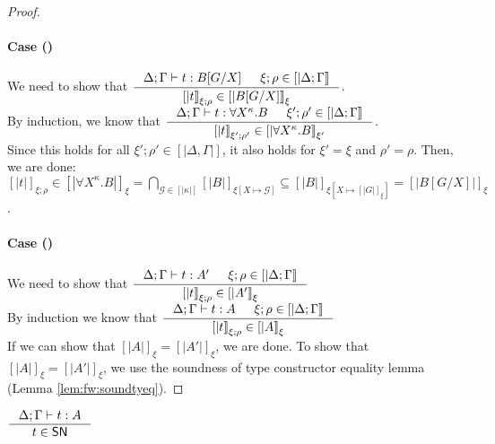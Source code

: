 \begin{proof}
\paragraph{Case ()}
We need to show that
$ \inference{\Delta;\Gamma |- t : B[G/X] & \xi;\rho\in[|\Delta;\Gamma|]}
        {[|t|]_{\xi;\rho} \in [|B[G/X]|]_\xi} $.
\vspace*{.3em} \\
By induction, we know that
$ \inference
        { \Delta;\Gamma |- t : \forall X^\kappa.B
        & \xi';\rho'\in[|\Delta;\Gamma|] }
        {[|t|]_{\xi';\rho'} \in [|\forall X^\kappa.B|]_{\xi'}} $.
\vspace*{.3em} \\
Since this holds for all $\xi';\rho' \in [|\Delta,\Gamma|]$,
it also holds for $\xi'=\xi$ and $\rho'=\rho$. Then, we are done:
$ [|t|]_{\xi;\rho} \in [|\forall X^\kappa.B|]_{\xi}
        = \bigcap_{\mathcal{G}\in[|\kappa|]} [|B|]_{\xi[X\mapsto\mathcal{G}]}
        \subseteq [|B|]_{\xi[X\mapsto[|G|]_\xi]} = [|B[G/X]|]_\xi $.

\paragraph{Case ()}
We need to show that
$ \inference{\Delta;\Gamma |- t : A' & \xi;\rho\in[|\Delta;\Gamma|]}
        {[|t|]_{\xi;\rho} \in [|A'|]_\xi} $
\vspace*{.3em} \\
By induction we know that 
$ \inference{\Delta;\Gamma |- t : A & \xi;\rho\in[|\Delta;\Gamma|]}
        {[|t|]_{\xi;\rho} \in [|A|]_\xi} $
\vspace*{.3em} \\
If we can show that $[|A|]_\xi = [|A'|]_\xi$, we are done.
To show that $[|A|]_\xi = [|A'|]_\xi$,
we use the soundness of type constructor equality lemma
(Lemma \ref{lem:fw:soundtyeq}).
\end{proof}

\begin{corollary}
        $\inference{\Delta;\Gamma |- t : A}{t \in \SN}$
\end{corollary}

